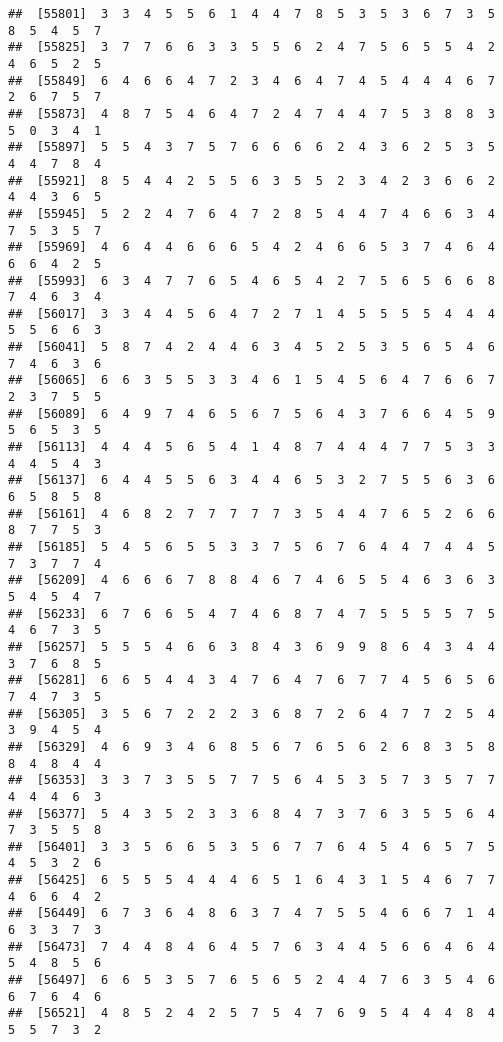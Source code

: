 \documentclass[
]{book}
\begin{document}
\begin{verbatim}
##  [55801]  3  3  4  5  5  6  1  4  4  7  8  5  3  5  3  6  7  3  5  8  5  4  5  7
##  [55825]  3  7  7  6  6  3  3  5  5  6  2  4  7  5  6  5  5  4  2  4  6  5  2  5
##  [55849]  6  4  6  6  4  7  2  3  4  6  4  7  4  5  4  4  4  6  7  2  6  7  5  7
##  [55873]  4  8  7  5  4  6  4  7  2  4  7  4  4  7  5  3  8  8  3  5  0  3  4  1
##  [55897]  5  5  4  3  7  5  7  6  6  6  6  2  4  3  6  2  5  3  5  4  4  7  8  4
##  [55921]  8  5  4  4  2  5  5  6  3  5  5  2  3  4  2  3  6  6  2  4  4  3  6  5
##  [55945]  5  2  2  4  7  6  4  7  2  8  5  4  4  7  4  6  6  3  4  7  5  3  5  7
##  [55969]  4  6  4  4  6  6  6  5  4  2  4  6  6  5  3  7  4  6  4  6  6  4  2  5
##  [55993]  6  3  4  7  7  6  5  4  6  5  4  2  7  5  6  5  6  6  8  7  4  6  3  4
##  [56017]  3  3  4  4  5  6  4  7  2  7  1  4  5  5  5  5  4  4  4  5  5  6  6  3
##  [56041]  5  8  7  4  2  4  4  6  3  4  5  2  5  3  5  6  5  4  6  7  4  6  3  6
##  [56065]  6  6  3  5  5  3  3  4  6  1  5  4  5  6  4  7  6  6  7  2  3  7  5  5
##  [56089]  6  4  9  7  4  6  5  6  7  5  6  4  3  7  6  6  4  5  9  5  6  5  3  5
##  [56113]  4  4  4  5  6  5  4  1  4  8  7  4  4  4  7  7  5  3  3  4  4  5  4  3
##  [56137]  6  4  4  5  5  6  3  4  4  6  5  3  2  7  5  5  6  3  6  6  5  8  5  8
##  [56161]  4  6  8  2  7  7  7  7  7  3  5  4  4  7  6  5  2  6  6  8  7  7  5  3
##  [56185]  5  4  5  6  5  5  3  3  7  5  6  7  6  4  4  7  4  4  5  7  3  7  7  4
##  [56209]  4  6  6  6  7  8  8  4  6  7  4  6  5  5  4  6  3  6  3  5  4  5  4  7
##  [56233]  6  7  6  6  5  4  7  4  6  8  7  4  7  5  5  5  5  7  5  4  6  7  3  5
##  [56257]  5  5  5  4  6  6  3  8  4  3  6  9  9  8  6  4  3  4  4  3  7  6  8  5
##  [56281]  6  6  5  4  4  3  4  7  6  4  7  6  7  7  4  5  6  5  6  7  4  7  3  5
##  [56305]  3  5  6  7  2  2  2  3  6  8  7  2  6  4  7  7  2  5  4  3  9  4  5  4
##  [56329]  4  6  9  3  4  6  8  5  6  7  6  5  6  2  6  8  3  5  8  8  4  8  4  4
##  [56353]  3  3  7  3  5  5  7  7  5  6  4  5  3  5  7  3  5  7  7  4  4  4  6  3
##  [56377]  5  4  3  5  2  3  3  6  8  4  7  3  7  6  3  5  5  6  4  7  3  5  5  8
##  [56401]  3  3  5  6  6  5  3  5  6  7  7  6  4  5  4  6  5  7  5  4  5  3  2  6
##  [56425]  6  5  5  5  4  4  4  6  5  1  6  4  3  1  5  4  6  7  7  4  6  6  4  2
##  [56449]  6  7  3  6  4  8  6  3  7  4  7  5  5  4  6  6  7  1  4  6  3  3  7  3
##  [56473]  7  4  4  8  4  6  4  5  7  6  3  4  4  5  6  6  4  6  4  5  4  8  5  6
##  [56497]  6  6  5  3  5  7  6  5  6  5  2  4  4  7  6  3  5  4  6  6  7  6  4  6
##  [56521]  4  8  5  2  4  2  5  7  5  4  7  6  9  5  4  4  4  8  4  5  5  7  3  2

\end{verbatim}
\end{document}
